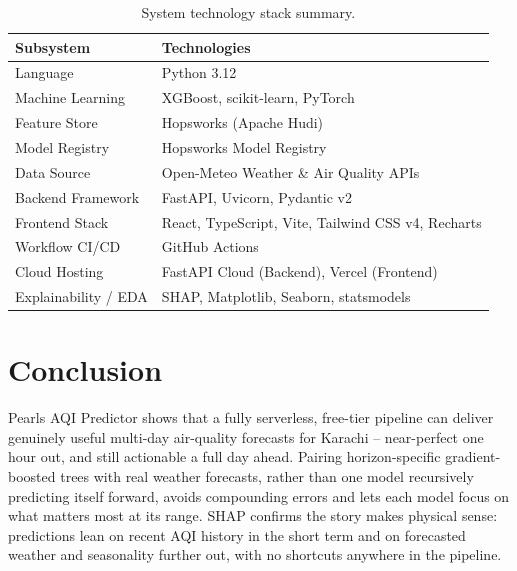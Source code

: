 \documentclass[12pt, a4paper]{article}
\begin{document}
\begin{table}[H]
\centering
\caption{System technology stack summary.}
\label{tab:tech_stack}
\begin{tabular}{ll}
\toprule
\textbf{Subsystem} & \textbf{Technologies} \\
\midrule
Language             & Python 3.12 \\
Machine Learning     & XGBoost, scikit-learn, PyTorch \\
Feature Store        & Hopsworks (Apache Hudi) \\
Model Registry       & Hopsworks Model Registry \\
Data Source          & Open-Meteo Weather \& Air Quality APIs \\
Backend Framework    & FastAPI, Uvicorn, Pydantic v2 \\
Frontend Stack       & React, TypeScript, Vite, Tailwind CSS v4, Recharts \\
Workflow CI/CD       & GitHub Actions \\
Cloud Hosting        & FastAPI Cloud (Backend), Vercel (Frontend) \\
Explainability / EDA & SHAP, Matplotlib, Seaborn, statsmodels \\
\bottomrule
\end{tabular}
\end{table}


\section{Conclusion}

Pearls AQI Predictor shows that a fully serverless, free-tier pipeline can deliver genuinely useful multi-day air-quality forecasts for Karachi -- near-perfect one hour out, and still actionable a full day ahead. Pairing horizon-specific gradient-boosted trees with real weather forecasts, rather than one model recursively predicting itself forward, avoids compounding errors and lets each model focus on what matters most at its range. SHAP confirms the story makes physical sense: predictions lean on recent AQI history in the short term and on forecasted weather and seasonality further out, with no shortcuts anywhere in the pipeline.
\end{document}
